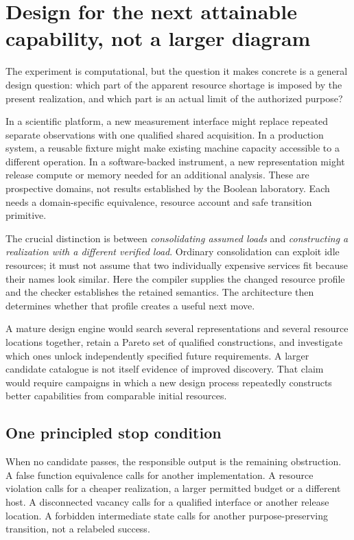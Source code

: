 \documentclass[11pt,letterpaper]{article}
\theoremstyle{definition}\newtheorem{definition}[theorem]{Definition}
\theoremstyle{remark}\newtheorem{remark}[theorem]{Remark}
\begin{document}
\section{Design for the next attainable capability, not a larger diagram}
\label{sec:scope}
The experiment is computational, but the question it makes concrete is a general design question: which part of the apparent resource shortage is imposed by the present realization, and which part is an actual limit of the authorized purpose?

In a scientific platform, a new measurement interface might replace repeated separate observations with one qualified shared acquisition. In a production system, a reusable fixture might make existing machine capacity accessible to a different operation. In a software-backed instrument, a new representation might release compute or memory needed for an additional analysis. These are prospective domains, not results established by the Boolean laboratory. Each needs a domain-specific equivalence, resource account and safe transition primitive.

The crucial distinction is between \emph{consolidating assumed loads} and \emph{constructing a realization with a different verified load}. Ordinary consolidation can exploit idle resources; it must not assume that two individually expensive services fit because their names look similar. Here the compiler supplies the changed resource profile and the checker establishes the retained semantics. The architecture then determines whether that profile creates a useful next move.

A mature design engine would search several representations and several resource locations together, retain a Pareto set of qualified constructions, and investigate which ones unlock independently specified future requirements. A larger candidate catalogue is not itself evidence of improved discovery. That claim would require campaigns in which a new design process repeatedly constructs better capabilities from comparable initial resources.

\subsection{One principled stop condition}
When no candidate passes, the responsible output is the remaining obstruction. A false function equivalence calls for another implementation. A resource violation calls for a cheaper realization, a larger permitted budget or a different host. A disconnected vacancy calls for a qualified interface or another release location. A forbidden intermediate state calls for another purpose-preserving transition, not a relabeled success.
\end{document}
